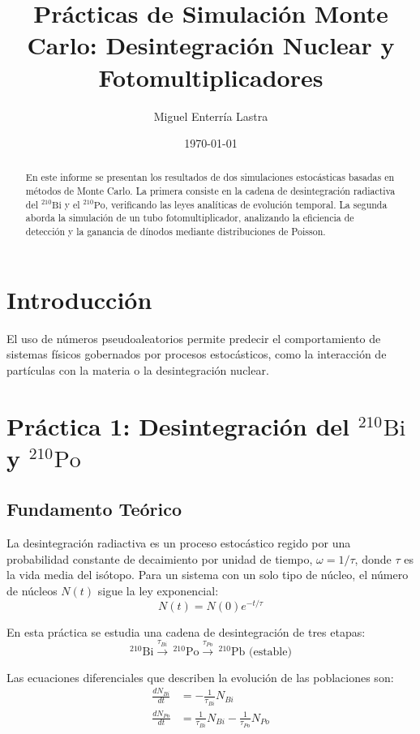 \documentclass[11pt,a4paper]{article}
\title{Prácticas de Simulación Monte Carlo: Desintegración Nuclear y Fotomultiplicadores}
\author{Miguel Enterría Lastra}
\date{\today}
\begin{document}
\maketitle

\begin{abstract}
En este informe se presentan los resultados de dos simulaciones estocásticas basadas en métodos de Monte Carlo. La primera consiste en la cadena de desintegración radiactiva del $^{210}\text{Bi}$ y el $^{210}\text{Po}$, verificando las leyes analíticas de evolución temporal. La segunda aborda la simulación de un tubo fotomultiplicador, analizando la eficiencia de detección y la ganancia de dínodos mediante distribuciones de Poisson.
\end{abstract}

\section{Introducción}
El uso de números pseudoaleatorios permite predecir el comportamiento de sistemas físicos gobernados por procesos estocásticos, como la interacción de partículas con la materia o la desintegración nuclear.

\section{Práctica 1: Desintegración del $^{210}\text{Bi}$ y $^{210}\text{Po}$}
\subsection{Fundamento Teórico}
La desintegración radiactiva es un proceso estocástico regido por una probabilidad constante de decaimiento por unidad de tiempo, $\omega = 1/\tau$, donde $\tau$ es la vida media del isótopo. Para un sistema con un solo tipo de núcleo, el número de núcleos $N(t)$ sigue la ley exponencial:
\begin{equation}
    N(t) = N(0) e^{-t/\tau}
\end{equation}

En esta práctica se estudia una cadena de desintegración de tres etapas:
\begin{equation}
    ^{210}\text{Bi} \xrightarrow{\tau_{Bi}} \, ^{210}\text{Po} \xrightarrow{\tau_{Po}} \, ^{210}\text{Pb (estable)}
\end{equation}

Las ecuaciones diferenciales que describen la evolución de las poblaciones son:
\begin{align}
    \frac{dN_{Bi}}{dt} &= -\frac{1}{\tau_{Bi}} N_{Bi} \\
    \frac{dN_{Po}}{dt} &= \frac{1}{\tau_{Bi}} N_{Bi} - \frac{1}{\tau_{Po}} N_{Po}
\end{align}
\end{document}
